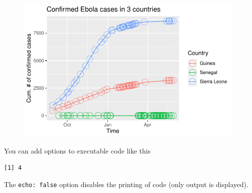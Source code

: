 \documentclass[
  letterpaper,
  DIV=11,
  numbers=noendperiod]{scrartcl}
\begin{document}
\begin{figure}[H]

{\centering \includegraphics{Day2_script_20230606_files/figure-pdf/unnamed-chunk-2-4.pdf}

}

\end{figure}

You can add options to executable code like this

\begin{verbatim}
[1] 4
\end{verbatim}

The \texttt{echo:\ false} option disables the printing of code (only
output is displayed).
\end{document}
